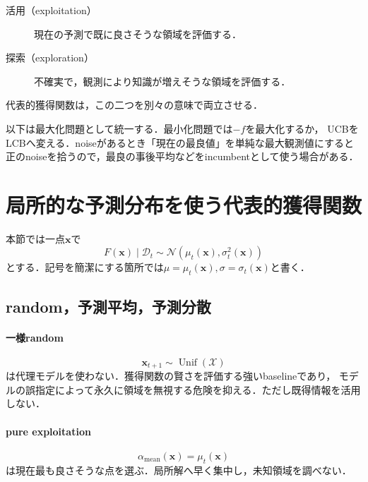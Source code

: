 \documentclass[a4paper,11pt]{ltjsarticle}
\newcommand{\N}{\mathcal N}
\newcommand{\D}{\mathcal D}
\begin{document}
\begin{description}
  \item[活用（exploitation）] 現在の予測で既に良さそうな領域を評価する．
  \item[探索（exploration）] 不確実で，観測により知識が増えそうな領域を評価する．
\end{description}
代表的獲得関数は，この二つを別々の意味で両立させる．

以下は最大化問題として統一する．最小化問題では\(-f\)を最大化するか，
UCBをLCBへ変える．noiseがあるとき「現在の最良値」を単純な最大観測値にすると
正のnoiseを拾うので，最良の事後平均などをincumbentとして使う場合がある．

\section{局所的な予測分布を使う代表的獲得関数}
\label{sec:local-acquisitions}

本節では一点\(\bm x\)で
\begin{equation}
  F(\bm x)\mid\D_t
  \sim\N(\mu_t(\bm x),\sigma_t^2(\bm x))
  \label{eq:bo-posterior}
\end{equation}
とする．記号を簡潔にする箇所では\(\mu=\mu_t(\bm x),\sigma=\sigma_t(\bm x)\)と書く．

\subsection{random，予測平均，予測分散}

\paragraph{一様random}
\begin{equation}
  \bm x_{t+1}\sim\operatorname{Unif}(\mathcal X)
\end{equation}
は代理モデルを使わない．獲得関数の賢さを評価する強いbaselineであり，
モデルの誤指定によって永久に領域を無視する危険を抑える．ただし既得情報を活用しない．

\paragraph{pure exploitation}
\begin{equation}
  \alpha_{\mathrm{mean}}(\bm x)=\mu_t(\bm x)
  \label{eq:posterior-mean-acquisition}
\end{equation}
は現在最も良さそうな点を選ぶ．局所解へ早く集中し，未知領域を調べない．
\end{document}
